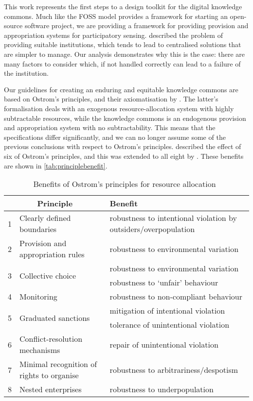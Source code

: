 This work represents the first steps to a design toolkit for the digital
knowledge commons. Much like the \ac{FOSS} model provides a framework for
starting an open-source software project, we are providing a framework for
providing provision and appropriation systems for participatory sensing.
\citet{Ostrom1990} described the problem of providing suitable institutions,
which tends to lead to centralised solutions that are simpler to manage. Our analysis
demonstrates why this is the case: there are many factors to consider which,
if not handled correctly can lead to a failure of the institution.

Our guidelines for creating an enduring and equitable knowledge commons are
based on Ostrom's principles, and their axiomatisation by \citet{Pitt2012b}.
The latter's formalisation deals with an exogenous resource-allocation system
with highly subtractable resources, while the knowledge commons is an
endogenous provision and appropriation system with no subtractability. This
means that the specifications differ significantly, and we can no longer
assume some of the previous conclusions with respect to Ostrom's principles.
\citet{Pitt2012b} described the effect of six of Ostrom's principles, and this was extended to all eight by \citet{Schaumeier2013}. These benefits are shown in \autoref{tab:principlebenefit}.

\begin{table}[ht]
\centering
\caption[Benefits of Ostrom's principles for resource allocation]{Benefits of Ostrom's principles for resource allocation~\citep{Schaumeier2013}}\label{tab:principlebenefit}
\begin{tabularx}{\textwidth}{lp{4cm}X}
\multicolumn{2}{c}{Principle} & Benefit \\
\hline
1 & Clearly defined boundaries & robustness to intentional violation by outsiders/overpopulation \\
2 & Provision and appropriation rules & robustness to environmental variation \\
\multirow{2}{*}{3} & \multirow{2}{*}{Collective choice} & robustness to environmental variation \\
 & & robustness to `unfair' behaviour \\
4 & Monitoring & robustness to non-compliant behaviour \\
\multirow{2}{*}{5} & \multirow{2}{*}{Graduated sanctions} & mitigation of intentional violation \\
 & & tolerance of unintentional violation \\
6 & Conflict-resolution mechanisms & repair of unintentional violation \\
7 & Minimal recognition of rights to organise & robustness to arbitrariness/despotism \\
8 & Nested enterprises & robustness to underpopulation \\
\end{tabularx}
\end{table}

